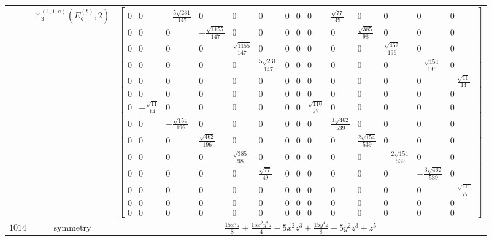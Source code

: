 \documentclass[fleqn,8pt,landscape]{jsarticle}
\begin{document}
\begin{longtable}{ccc}
$  $ & $ \mathbb{M}_{3}^{(1,1;a)}(E_{g}^{(b)},2) $ & $ \begin{bmatrix} 0 & 0 & - \frac{5 \sqrt{231}}{147} & 0 & 0 & 0 & 0 & 0 & 0 & \frac{\sqrt{77}}{49} & 0 & 0 & 0 & 0 \\ 0 & 0 & 0 & - \frac{\sqrt{1155}}{147} & 0 & 0 & 0 & 0 & 0 & 0 & \frac{\sqrt{385}}{98} & 0 & 0 & 0 \\ 0 & 0 & 0 & 0 & \frac{\sqrt{1155}}{147} & 0 & 0 & 0 & 0 & 0 & 0 & \frac{\sqrt{462}}{196} & 0 & 0 \\ 0 & 0 & 0 & 0 & 0 & \frac{5 \sqrt{231}}{147} & 0 & 0 & 0 & 0 & 0 & 0 & - \frac{\sqrt{154}}{196} & 0 \\ 0 & 0 & 0 & 0 & 0 & 0 & 0 & 0 & 0 & 0 & 0 & 0 & 0 & - \frac{\sqrt{11}}{14} \\ 0 & 0 & 0 & 0 & 0 & 0 & 0 & 0 & 0 & 0 & 0 & 0 & 0 & 0 \\ 0 & - \frac{\sqrt{11}}{14} & 0 & 0 & 0 & 0 & 0 & 0 & \frac{\sqrt{110}}{77} & 0 & 0 & 0 & 0 & 0 \\ 0 & 0 & - \frac{\sqrt{154}}{196} & 0 & 0 & 0 & 0 & 0 & 0 & \frac{3 \sqrt{462}}{539} & 0 & 0 & 0 & 0 \\ 0 & 0 & 0 & \frac{\sqrt{462}}{196} & 0 & 0 & 0 & 0 & 0 & 0 & \frac{2 \sqrt{154}}{539} & 0 & 0 & 0 \\ 0 & 0 & 0 & 0 & \frac{\sqrt{385}}{98} & 0 & 0 & 0 & 0 & 0 & 0 & - \frac{2 \sqrt{154}}{539} & 0 & 0 \\ 0 & 0 & 0 & 0 & 0 & \frac{\sqrt{77}}{49} & 0 & 0 & 0 & 0 & 0 & 0 & - \frac{3 \sqrt{462}}{539} & 0 \\ 0 & 0 & 0 & 0 & 0 & 0 & 0 & 0 & 0 & 0 & 0 & 0 & 0 & - \frac{\sqrt{110}}{77} \\ 0 & 0 & 0 & 0 & 0 & 0 & 0 & 0 & 0 & 0 & 0 & 0 & 0 & 0 \\ 0 & 0 & 0 & 0 & 0 & 0 & 0 & 0 & 0 & 0 & 0 & 0 & 0 & 0 \end{bmatrix} $ \\ \hline
$ 1014 $ & $ \text{symmetry} $ & $ \frac{15 x^{4} z}{8} + \frac{15 x^{2} y^{2} z}{4} - 5 x^{2} z^{3} + \frac{15 y^{4} z}{8} - 5 y^{2} z^{3} + z^{5} $ \\

\end{longtable}
\end{document}
